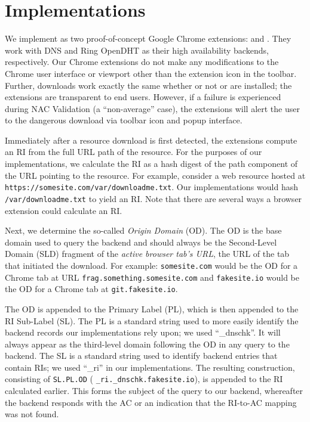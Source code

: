 \section{Implementations} \label{sec:implementation}

We implement \SYSTEM{} as two proof-of-concept Google Chrome extensions:
\DNSSYS{} and \DHTSYS{}. They work with DNS and Ring OpenDHT as their high
availability backends, respectively. Our Chrome extensions do not make any
modifications to the Chrome user interface or viewport other than the extension
icon in the toolbar. Further, downloads work exactly the same whether or not
\DNSSYS{} or \DHTSYS{} are installed; the extensions are transparent to end
users. However, if a failure is experienced during NAC Validation (\ie a
``non-average'' case), the extensions will alert the user to the dangerous
download via toolbar icon and popup interface.

Immediately after a resource download is first detected, the extensions compute
an RI from the full URL path of the resource. For the purposes of our
implementations, we calculate the RI as a hash digest of the path component of
the URL pointing to the resource. For example, consider a web resource hosted at
\texttt{https://somesite.com/var/downloadme.txt}. Our implementations would hash
\texttt{/var/downloadme.txt} to yield an RI. Note that there are several ways a
browser extension could calculate an RI.

Next, we determine the so-called \emph{Origin Domain} (OD). The OD is the base
domain used to query the backend and should always be the Second-Level Domain
(SLD) fragment of the \emph{active browser tab's URL}, \ie the URL of the tab
that initiated the download. For example: \texttt{somesite.com} would be the OD
for a Chrome tab at URL \texttt{frag.something.somesite.com} and
\texttt{fakesite.io} would be the OD for a Chrome tab at
\texttt{git.fakesite.io}.

The OD is appended to the Primary Label (PL), which is then appended to the RI
Sub-Label (SL). The PL is a standard string used to more easily identify the
backend records our implementations rely upon; we used ``\_dnschk''. It will
always appear as the third-level domain following the OD in any query to the
backend. The SL is a standard string used to identify backend entries that
contain RIs; we used ``\_ri'' in our implementations. The resulting
construction, consisting of \texttt{SL.PL.OD} (\eg
\texttt{\_ri.\_dnschk.fakesite.io}), is appended to the RI calculated earlier.
This forms the subject of the query to our backend, whereafter the backend
responds with the AC or an indication that the RI-to-AC mapping was not found.

